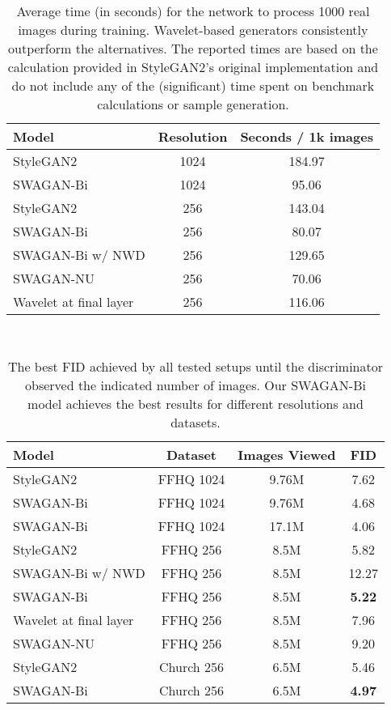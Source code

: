 \documentclass[final]{CVPR2021/cvpr}
\begin{document}
\begin{table}[!hbt] \footnotesize
    \centering
    \begin{tabular}{lcc}\hline
        \bf{Model} & \bf{Resolution} & \bf{Seconds / 1k images } \\\hline
        StyleGAN2 & 1024 & 184.97 \\
        SWAGAN-Bi & 1024 & 95.06 \\ \hline
        StyleGAN2 & 256 & 143.04 \\
        SWAGAN-Bi & 256 & 80.07 \\
        SWAGAN-Bi w/ NWD & 256 & 129.65 \\
        SWAGAN-NU & 256 & 70.06 \\
        Wavelet at final layer & 256 & 116.06 \\ \hline
    \end{tabular}\\
    \caption{Average time (in seconds) for the network to process 1000 real images during training. Wavelet-based generators consistently outperform the alternatives. The reported times are based on the calculation provided in StyleGAN2's original implementation and do not include any of the (significant) time spent on benchmark calculations or sample generation.}
    \label{tab:train_times}
\end{table}

\begin{table}[!hbt] \footnotesize
    \centering
    \begin{tabular}{lccc}\hline
        \bf{Model} & \bf{Dataset} & \bf{Images Viewed} & \bf{FID } \\\hline
        StyleGAN2 & FFHQ 1024 & 9.76M & 7.62 \\
        SWAGAN-Bi & FFHQ 1024 & 9.76M & 4.68 \\
        SWAGAN-Bi & FFHQ 1024 & 17.1M & 4.06 \\ \hline
        StyleGAN2 & FFHQ 256 & 8.5M & 5.82 \\
        SWAGAN-Bi w/ NWD & FFHQ 256 & 8.5M & 12.27 \\
        SWAGAN-Bi & FFHQ 256 & 8.5M & \bf{5.22} \\
        Wavelet at final layer & FFHQ 256 & 8.5M & 7.96 \\ 
        SWAGAN-NU & FFHQ 256 & 8.5M & 9.20 \\ \hline
        StyleGAN2 & Church 256 & 6.5M & 5.46 \\
        SWAGAN-Bi & Church 256 & 6.5M & \bf{4.97} \\
        \hline
    \end{tabular}\\
    \caption{The best FID achieved by all tested setups until the discriminator observed the indicated number of images. Our SWAGAN-Bi model achieves the best results for different resolutions and datasets.}
    \label{tab:fid_compare}
\end{table}
\end{document}
